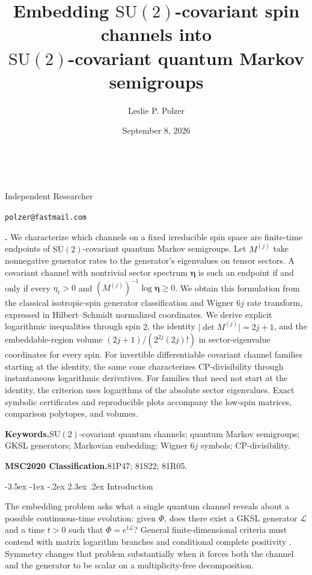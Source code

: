 \documentclass[twoside,10pt]{article}
\title{Embedding \(\mathrm{SU}(2)\)-covariant spin channels into\\
\(\mathrm{SU}(2)\)-covariant quantum Markov semigroups}
\author{Leslie P. Polzer}
\date{September 8, 2026}
\makeatletter
\numberwithin{equation}{section}
\theoremstyle{slbody}
\theoremstyle{definition}
\theoremstyle{remark}
\newcommand{\cL}{\mathcal L}
\newcommand{\authoraffiliation}{Independent Researcher}
\newcommand{\authoremail}{polzer@fastmail.com}
\renewcommand{\section}{%
  \@startsection{section}{1}{\z@}%
    {-3.5ex \@plus -1ex \@minus -.2ex}%
    {2.3ex \@plus .2ex}%
    {\normalfont\large\bfseries}}
\renewcommand{\maketitle}{%
  \begin{center}
    {\large\bfseries\@title}\\
    \vskip36pt
    \ifx\@author\@empty
      \mbox{}\par
    \else
      {\scshape\@author}\par
      \medskip
      {\small\authoraffiliation}\par
      \smallskip
      {\small\texttt{\authoremail}}\par
      \smallskip
      {\small\@date}\par
    \fi
    \vskip36pt
  \end{center}}
\renewenvironment{abstract}
  {\quotation\noindent\small{\bfseries\abstractname.\enspace}}
  {\endquotation}
\makeatother
\begin{document}
\maketitle

\begin{abstract}
We characterize which channels on a fixed irreducible spin space are
finite-time endpoints of \(\mathrm{SU}(2)\)-covariant quantum Markov
semigroups.  Let \(M^{(j)}\) take nonnegative generator rates to the
generator's eigenvalues on tensor sectors.  A covariant channel with nontrivial
sector spectrum \(\bm\eta\) is such an endpoint if and only if every
\(\eta_\ell>0\) and \((M^{(j)})^{-1}\log\bm\eta\geq0\).
We obtain this formulation from the classical isotropic-spin generator
classification and Wigner \(6j\) rate transform, expressed in
Hilbert--Schmidt normalized coordinates.  We derive explicit logarithmic
inequalities through spin \(2\), the identity
\(\lvert\det M^{(j)}\rvert=2j+1\), and the embeddable-region volume
\((2j+1)/(2^{2j}(2j)!)\) in sector-eigenvalue coordinates for every spin.
For invertible differentiable covariant channel families starting at the
identity, the same cone characterizes CP-divisibility through instantaneous
logarithmic derivatives.  For families that need not start at the identity,
the criterion uses logarithms of the absolute sector eigenvalues.
Exact symbolic certificates and reproducible plots accompany the low-spin
matrices, comparison polytopes, and volumes.

\vskip5pt
\noindent\textbf{Keywords.}\enspace \(\mathrm{SU}(2)\)-covariant quantum channels;
quantum Markov semigroups; GKSL generators; Markovian embedding; Wigner
\(6j\) symbols; CP-divisibility.

\vskip5pt
\noindent\textbf{MSC2020 Classification.}\enspace 81P47; 81S22; 81R05.
\end{abstract}

\vskip50pt
\baselineskip=13.5pt
\section{Introduction}

The embedding problem asks what a single quantum channel reveals about
a possible continuous-time evolution: given \(\Phi\), does there exist a
GKSL generator \(\cL\) and a time \(t>0\) such that
\(\Phi=e^{t\cL}\)?  General finite-dimensional criteria must contend
with matrix logarithm branches and conditional complete positivity
\cite[Eqs.~(2)--(5)]{WolfEisertCubittCirac2008}.  Symmetry changes that problem
substantially when it forces both the channel and the generator to be
scalar on a multiplicity-free decomposition.
\end{document}
